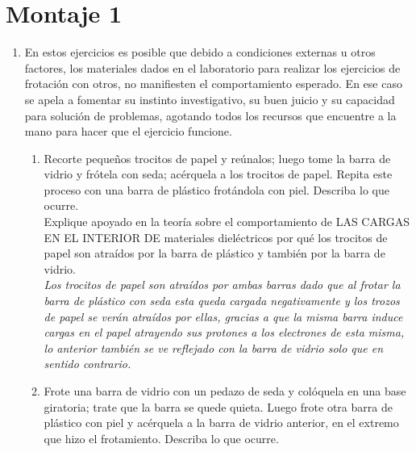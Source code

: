 \section{Montaje 1}

\renewcommand{\labelenumii}{\arabic{enumi}.\arabic{enumii}}
\renewcommand{\labelenumiii}{\arabic{enumi}.\arabic{enumii}.\arabic{enumiii}}
\renewcommand{\labelenumiv}
{\arabic{enumi}.\arabic{enumii}.\arabic{enumiii}.\arabic{enumiv}}

\begin{enumerate}
    \item En estos ejercicios es posible que debido a condiciones externas u
    otros factores, los materiales dados en el laboratorio para realizar los
    ejercicios de frotación con otros, no manifiesten el comportamiento
    esperado. En ese caso se apela a fomentar su instinto investigativo, su buen
    juicio y su capacidad para solución de problemas, agotando todos los
    recursos que encuentre a la mano para hacer que el ejercicio funcione.
    \begin{enumerate}
        \item Recorte pequeños trocitos de papel y reúnalos; luego tome la barra
        de vidrio y frótela con seda; acérquela a los trocitos de papel. Repita
        este proceso con una barra de plástico frotándola con piel. Describa lo
        que ocurre.\\
        Explique apoyado en la teoría sobre el comportamiento de LAS CARGAS EN
        EL INTERIOR DE materiales dieléctricos por qué los trocitos de papel son
        atraídos por la barra de plástico y también por la barra de vidrio.\\

        \textit{
            Los trocitos de papel son atraídos por ambas barras dado que al 
            frotar la barra de plástico con seda esta queda cargada
            negativamente y los trozos de papel se verán atraídos por ellas,
            gracias a que la misma barra induce cargas en el papel atrayendo sus
            protones a los electrones de esta misma, lo anterior también se ve
            reflejado con la barra de vidrio solo que en sentido contrario.
        }

        \item Frote una barra de vidrio con un pedazo de seda y colóquela en una
        base giratoria; trate que la barra se quede quieta. Luego frote otra
        barra de plástico con piel y acérquela a la barra de vidrio anterior, en
        el extremo que hizo el frotamiento. Describa lo que ocurre.\\


\end{enumerate}
\end{enumerate}
